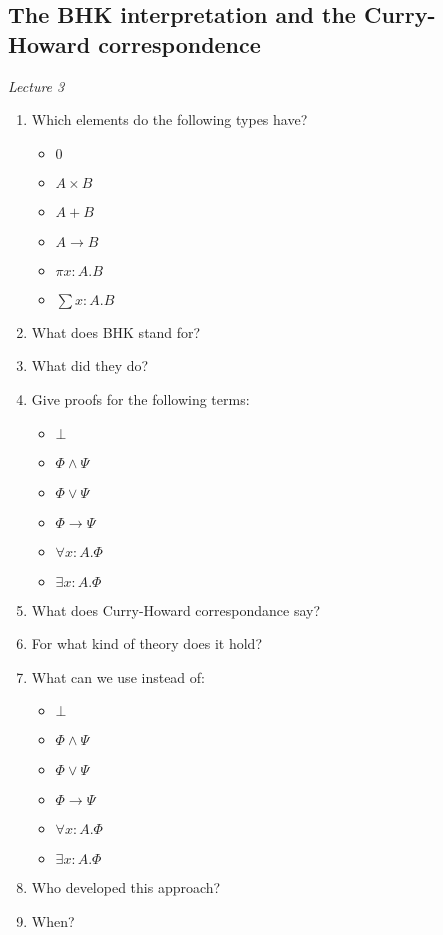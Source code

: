 \documentclass[fleqn]{article}
\begin{document}
\subsection{The BHK interpretation and the Curry-Howard correspondence}
\textit{Lecture 3}
\begin{enumerate}
    \item Which elements do the following types have?
    \begin{itemize}
        \item $0$
        \item $A \times B$
        \item $A + B$
        \item $A \rightarrow B$
        \item $\pi x: A.B$
        \item $\sum x: A.B$
    \end{itemize}
    \item What does BHK stand for?
    \item What did they do?
    \item Give proofs for the following terms:
    \begin{itemize}
        \item $\bot$
        \item $\Phi \wedge \Psi$
        \item $\Phi \vee \Psi$
        \item $\Phi \rightarrow \Psi$
        \item $\forall x : A. \Phi$
        \item $\exists x: A. \Phi$
    \end{itemize}
    \item What does Curry-Howard correspondance say?
    \item For what kind of theory does it hold?
    \item What can we use instead of:
    \begin{itemize}
        \item $\bot$
        \item $\Phi \wedge \Psi$
        \item $\Phi \vee \Psi$
        \item $\Phi \rightarrow \Psi$
        \item $\forall x : A. \Phi$
        \item $\exists x: A. \Phi$
    \end{itemize}
    \item Who developed this approach?
    \item When?

\end{enumerate}
\end{document}
